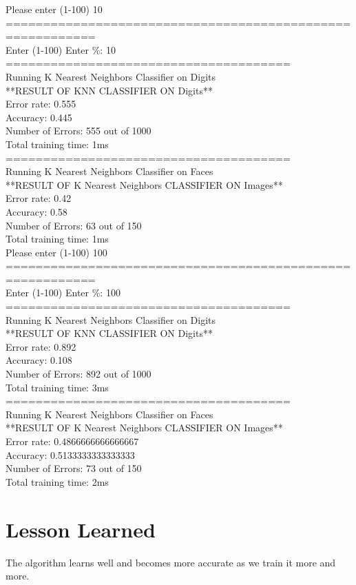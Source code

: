 \documentclass{article}
\begin{document}
        Please enter (1-100)%
        10\\
        ==========================================================\\
        Enter (1-100)%
        Enter \%: 10\\
        ======================================\\
        Running K Nearest Neighbors Classifier on Digits\\
        **RESULT OF KNN CLASSIFIER ON Digits**\\
        Error rate: 0.555 \\
        Accuracy: 0.445\\
        Number of Errors: 555 out of 1000\\
        Total training time: 1ms\\
        ======================================\\
        Running K Nearest Neighbors Classifier on Faces\\
        **RESULT OF K Nearest Neighbors CLASSIFIER ON Images**\\
        Error rate: 0.42 \\
        Accuracy: 0.58\\
        Number of Errors: 63 out of 150\\
        Total training time: 1ms\\
        
        Please enter (1-100)%
        100\\
        ==========================================================\\
        Enter (1-100)%
        Enter \%: 100\\
        ======================================\\
        Running K Nearest Neighbors Classifier on Digits\\
        **RESULT OF KNN CLASSIFIER ON Digits**\\
        Error rate: 0.892 \\
        Accuracy: 0.108\\
        Number of Errors: 892 out of 1000\\
        Total training time: 3ms\\
        ======================================\\
        Running K Nearest Neighbors Classifier on Faces\\
        **RESULT OF K Nearest Neighbors CLASSIFIER ON Images**\\
        Error rate: 0.4866666666666667  \\
        Accuracy: 0.5133333333333333\\
        Number of Errors: 73 out of 150\\
        Total training time: 2ms\\
        

        
   


\section{Lesson Learned}
    \qquad The algorithm learns well and becomes more accurate as we train it more and more.
         
\end{document}
